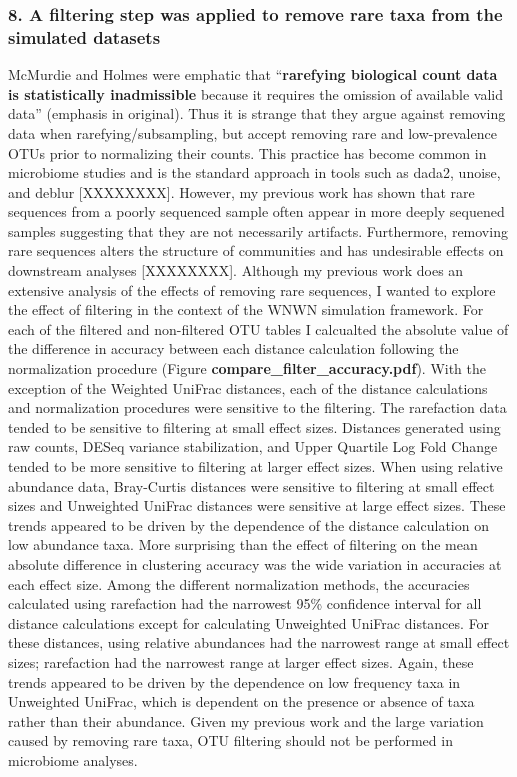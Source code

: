 \documentclass[
]{article}
\begin{document}
\hypertarget{a-filtering-step-was-applied-to-remove-rare-taxa-from-the-simulated-datasets}{%
\subsubsection{8. A filtering step was applied to remove rare taxa from
the simulated
datasets}\label{a-filtering-step-was-applied-to-remove-rare-taxa-from-the-simulated-datasets}}

McMurdie and Holmes were emphatic that ``\textbf{rarefying biological
count data is statistically inadmissible} because it requires the
omission of available valid data'' (emphasis in original). Thus it is
strange that they argue against removing data when
rarefying/subsampling, but accept removing rare and low-prevalence OTUs
prior to normalizing their counts. This practice has become common in
microbiome studies and is the standard approach in tools such as dada2,
unoise, and deblur {[}XXXXXXXX{]}. However, my previous work has shown
that rare sequences from a poorly sequenced sample often appear in more
deeply sequened samples suggesting that they are not necessarily
artifacts. Furthermore, removing rare sequences alters the structure of
communities and has undesirable effects on downstream analyses
{[}XXXXXXXX{]}. Although my previous work does an extensive analysis of
the effects of removing rare sequences, I wanted to explore the effect
of filtering in the context of the WNWN simulation framework. For each
of the filtered and non-filtered OTU tables I calcualted the absolute
value of the difference in accuracy between each distance calculation
following the normalization procedure (Figure
\textbf{compare\_filter\_accuracy.pdf}). With the exception of the
Weighted UniFrac distances, each of the distance calculations and
normalization procedures were sensitive to the filtering. The
rarefaction data tended to be sensitive to filtering at small effect
sizes. Distances generated using raw counts, DESeq variance
stabilization, and Upper Quartile Log Fold Change tended to be more
sensitive to filtering at larger effect sizes. When using relative
abundance data, Bray-Curtis distances were sensitive to filtering at
small effect sizes and Unweighted UniFrac distances were sensitive at
large effect sizes. These trends appeared to be driven by the dependence
of the distance calculation on low abundance taxa. More surprising than
the effect of filtering on the mean absolute difference in clustering
accuracy was the wide variation in accuracies at each effect size. Among
the different normalization methods, the accuracies calculated using
rarefaction had the narrowest 95\% confidence interval for all distance
calculations except for calculating Unweighted UniFrac distances. For
these distances, using relative abundances had the narrowest range at
small effect sizes; rarefaction had the narrowest range at larger effect
sizes. Again, these trends appeared to be driven by the dependence on
low frequency taxa in Unweighted UniFrac, which is dependent on the
presence or absence of taxa rather than their abundance. Given my
previous work and the large variation caused by removing rare taxa, OTU
filtering should not be performed in microbiome analyses.
\end{document}
